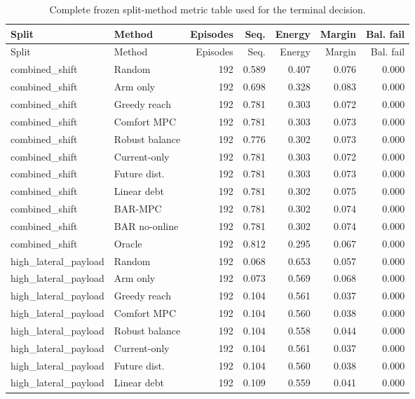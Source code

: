 \begin{longtable}{llrrrrr}
\caption{Complete frozen split-method metric table used for the terminal decision.}\label{tab:full-metrics}\\
\toprule
Split & Method & Episodes & Seq. & Energy & Margin & Bal. fail \\
\midrule
\endfirsthead
\toprule
Split & Method & Episodes & Seq. & Energy & Margin & Bal. fail \\
\midrule
\endhead
combined\_shift & Random & 192 & 0.589 & 0.407 & 0.076 & 0.000 \\
combined\_shift & Arm only & 192 & 0.698 & 0.328 & 0.083 & 0.000 \\
combined\_shift & Greedy reach & 192 & 0.781 & 0.303 & 0.072 & 0.000 \\
combined\_shift & Comfort MPC & 192 & 0.781 & 0.303 & 0.073 & 0.000 \\
combined\_shift & Robust balance & 192 & 0.776 & 0.302 & 0.073 & 0.000 \\
combined\_shift & Current-only & 192 & 0.781 & 0.303 & 0.072 & 0.000 \\
combined\_shift & Future dist. & 192 & 0.781 & 0.303 & 0.073 & 0.000 \\
combined\_shift & Linear debt & 192 & 0.781 & 0.302 & 0.075 & 0.000 \\
combined\_shift & BAR-MPC & 192 & 0.781 & 0.302 & 0.074 & 0.000 \\
combined\_shift & BAR no-online & 192 & 0.781 & 0.302 & 0.074 & 0.000 \\
combined\_shift & Oracle & 192 & 0.812 & 0.295 & 0.067 & 0.000 \\
high\_lateral\_payload & Random & 192 & 0.068 & 0.653 & 0.057 & 0.000 \\
high\_lateral\_payload & Arm only & 192 & 0.073 & 0.569 & 0.068 & 0.000 \\
high\_lateral\_payload & Greedy reach & 192 & 0.104 & 0.561 & 0.037 & 0.000 \\
high\_lateral\_payload & Comfort MPC & 192 & 0.104 & 0.560 & 0.038 & 0.000 \\
high\_lateral\_payload & Robust balance & 192 & 0.104 & 0.558 & 0.044 & 0.000 \\
high\_lateral\_payload & Current-only & 192 & 0.104 & 0.561 & 0.037 & 0.000 \\
high\_lateral\_payload & Future dist. & 192 & 0.104 & 0.560 & 0.038 & 0.000 \\
high\_lateral\_payload & Linear debt & 192 & 0.109 & 0.559 & 0.041 & 0.000 \\

\end{longtable}
